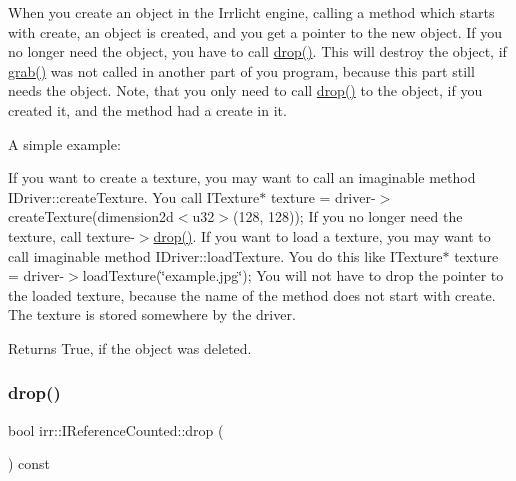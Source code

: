 When you create an object in the Irrlicht engine, calling a method which starts with \textquotesingle{}create\textquotesingle{}, an object is created, and you get a pointer to the new object. If you no longer need the object, you have to call \hyperlink{classirr_1_1IReferenceCounted_a03856a09355b89d178090c4a5f738543}{drop()}. This will destroy the object, if \hyperlink{classirr_1_1IReferenceCounted_a396f9cdbe311ada278626477b3c6f0f5}{grab()} was not called in another part of you program, because this part still needs the object. Note, that you only need to call \hyperlink{classirr_1_1IReferenceCounted_a03856a09355b89d178090c4a5f738543}{drop()} to the object, if you created it, and the method had a \textquotesingle{}create\textquotesingle{} in it.

A simple example\+:

If you want to create a texture, you may want to call an imaginable method I\+Driver\+::create\+Texture. You call I\+Texture$\ast$ texture = driver-\/$>$create\+Texture(dimension2d$<$u32$>$(128, 128)); If you no longer need the texture, call texture-\/$>$\hyperlink{classirr_1_1IReferenceCounted_a03856a09355b89d178090c4a5f738543}{drop()}. If you want to load a texture, you may want to call imaginable method I\+Driver\+::load\+Texture. You do this like I\+Texture$\ast$ texture = driver-\/$>$load\+Texture(\char`\"{}example.\+jpg\char`\"{}); You will not have to drop the pointer to the loaded texture, because the name of the method does not start with \textquotesingle{}create\textquotesingle{}. The texture is stored somewhere by the driver. \begin{DoxyReturn}{Returns}
True, if the object was deleted. 
\end{DoxyReturn}
\mbox{\label{classirr_1_1IReferenceCounted_a03856a09355b89d178090c4a5f738543}} 
\subsubsection{\texorpdfstring{drop()}{drop()}\hspace{0.1cm}{\footnotesize\ttfamily [2/2]}}
{\footnotesize\ttfamily bool irr\+::\+I\+Reference\+Counted\+::drop (\begin{DoxyParamCaption}{ }\end{DoxyParamCaption}) const\hspace{0.3cm}{\ttfamily [inline]}}



